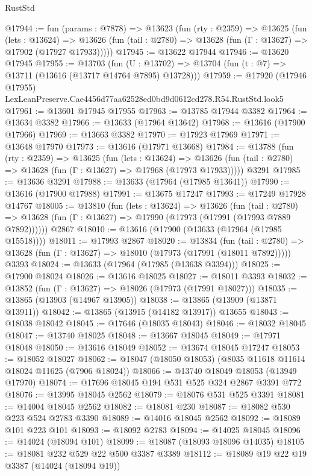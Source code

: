 \begin{lexlean}{RustStd}
\begin{coremodule}
@17944 := fun (params : @7878) =>
  @13623
    (fun (rty : @2359) =>
    @13625
      (fun (lets : @13624) =>
      @13626 (fun (tail : @2780) => @13628 (fun (Γ : @13627) => @17902 (@17927 @17933)))))
@17945 := @13622 @17944
@17946 := @13620 @17945
@17955 := @13703
    (fun (U : @13702) => @13704 (fun (t : @7) => @13711 (@13616 (@13717 @14764 @7895) @13728)))
@17959 := @17920 (@17946 @17955) LexLeanPreserve.Cae4456d77aa62528ed0bd9d0612cd278.R54.RustStd.look5
@17961 := @13601 @17945 @17955
@17963 := @13785 @17944 @3382
@17964 := @13634 @3382
@17966 := @13633 (@17964 @13642)
@17968 := @13616 (@17900 @17966)
@17969 := @13663 @3382
@17970 := @17923 @17969
@17971 := @13648 @17970
@17973 := @13616 (@17971 @13668)
@17984 := @13788
    (fun (rty : @2359) =>
    @13625
      (fun (lets : @13624) =>
      @13626 (fun (tail : @2780) => @13628 (fun (Γ : @13627) => @17968 (@17973 @17933)))))
    @3291
@17985 := @13636 @3291
@17988 := @13633 (@17964 (@17985 @13641))
@17990 := @13616 (@17900 @17988)
@17991 := @13675 @17247
@17993 := @17249 @17928 @14767
@18005 := @13810
    (fun (lets : @13624) =>
    @13626
      (fun (tail : @2780) =>
      @13628 (fun (Γ : @13627) => @17990 (@17973 (@17991 (@17993 @7889 @7892))))))
    @2867
@18010 := @13616 (@17900 (@13633 (@17964 (@17985 @15518))))
@18011 := @17993 @2867
@18020 := @13834
    (fun (tail : @2780) => @13628 (fun (Γ : @13627) => @18010 (@17973 (@17991 (@18011 @7892)))))
    @3393
@18024 := @13633 (@17964 (@17985 (@13638 @3394)))
@18025 := @17900 @18024
@18026 := @13616 @18025
@18027 := @18011 @3393
@18032 := @13852 (fun (Γ : @13627) => @18026 (@17973 (@17991 @18027)))
@18035 := @13865 (@13903 (@14967 @13905))
@18038 := @13865 (@13909 (@13871 @13911))
@18042 := @13865 (@13915 (@14182 @13917)) @13655
@18043 := @18038 @18042
@18045 := @17646 (@18035 @18043)
@18046 := @18032 @18045
@18047 := @13740 @18025
@18048 := @13667 @18045
@18049 := @17971 @18048
@18050 := @13616 @18049
@18052 := @13674 @18045 @17247
@18053 := @18052 @18027
@18062 := @18047 (@18050 @18053) (@8035 @11618 @11614 @18024 @11625 (@7906 @18024))
@18066 := @13740 @18049 @18053 (@13949 @17970)
@18074 := @17696 @18045 @194 @531 @525 @324 @2867 @3391 @772
@18076 := @13995 @18045 @2562
@18079 := @18076 @531 @525 @3391
@18081 := @14004 @18045 @2562
@18082 := @18081 @230
@18087 := @18082 @530 @223 @524 @2783 @3390
@18089 := @14016 @18045 @2562
@18092 := @18089 @101 @223 @101
@18093 := @18092 @2783
@18094 := @14025 @18045
@18096 := @14024 (@18094 @101)
@18099 := @18087 (@18093 @18096 @14035)
@18105 := @18081 @232 @529 @22 @500 @3387 @3389
@18112 := @18089 @19 @22 @19 @3387 (@14024 (@18094 @19))

\end{coremodule}
\end{lexlean}
